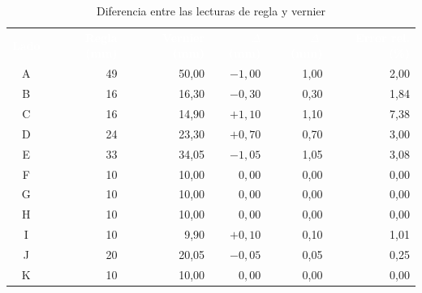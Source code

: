\documentclass[12pt,a4paper]{article}
\newcommand{\encab}[1]{\textcolor{white}{\sffamily\bfseries #1}}
\begin{document}
\begin{table}[!htb]
	\centering
	\caption{Diferencia entre las lecturas de regla y
		vernier}\label{tab:comparacion}
	\small
	\begin{tabular}{c r r r r r}
		\rowcolor{darkblue}
		\encab{Lado}            & \encab{Regla (mm)}      & \encab{Vernier (mm)} &
		\encab{$\Delta$
			(mm)}
		                        &
		\encab{$|\Delta|$ (mm)} & \encab{Error rel. (\%)}
		\\
		A                       & 49                      & 50,00                &
		$-1{,}00$
		                        & 1,00                    & 2,00
		\\
		B                       & 16                      & 16,30                &
		$-0{,}30$
		                        & 0,30                    & 1,84
		\\
		C                       & 16                      & 14,90                &
		$+1{,}10$
		                        & 1,10                    & 7,38
		\\
		D                       & 24                      & 23,30                &
		$+0{,}70$
		                        & 0,70                    & 3,00
		\\
		E                       & 33                      & 34,05                &
		$-1{,}05$               & 1,05                    & 3,08
		\\
		F                       & 10                      & 10,00                &
		$0{,}00$
		                        & 0,00                    & 0,00
		\\
		G                       & 10                      & 10,00                &
		$0{,}00$
		                        & 0,00                    & 0,00
		\\
		H                       & 10                      & 10,00                &
		$0{,}00$                & 0,00                    & 0,00
		\\
		I                       & 10                      & 9,90                 &
		$+0{,}10$
		                        & 0,10                    & 1,01
		\\
		J                       & 20                      & 20,05                &
		$-0{,}05$
		                        & 0,05                    & 0,25
		\\
		K                       & 10                      & 10,00                &
		$0{,}00$
		                        & 0,00                    & 0,00
		\\

\end{tabular}
\end{table}
\end{document}
